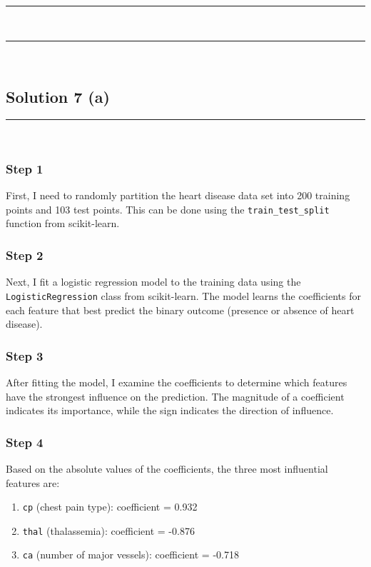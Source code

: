 \documentclass{article}
\begin{document}
\noindent\rule{\textwidth}{0.4pt}\\

\noindent\rule{\textwidth}{0.4pt}\\

\subsection*{Solution 7 (a)}
\noindent\rule{\textwidth}{0.4pt}\\

\subsubsection*{Step 1}
\parbox{\textwidth}{
First, I need to randomly partition the heart disease data set into 200 training points and 103 test points. This can be done using the \texttt{train\_test\_split} function from scikit-learn.
}

\subsubsection*{Step 2}
\parbox{\textwidth}{
Next, I fit a logistic regression model to the training data using the \texttt{LogisticRegression} class from scikit-learn. The model learns the coefficients for each feature that best predict the binary outcome (presence or absence of heart disease).
}

\subsubsection*{Step 3}
\parbox{\textwidth}{
After fitting the model, I examine the coefficients to determine which features have the strongest influence on the prediction. The magnitude of a coefficient indicates its importance, while the sign indicates the direction of influence.
}

\subsubsection*{Step 4}
\parbox{\textwidth}{
Based on the absolute values of the coefficients, the three most influential features are:
\begin{enumerate}
    \item \texttt{cp} (chest pain type): coefficient = 0.932
    \item \texttt{thal} (thalassemia): coefficient = -0.876
    \item \texttt{ca} (number of major vessels): coefficient = -0.718
\end{enumerate}
}
\end{document}
